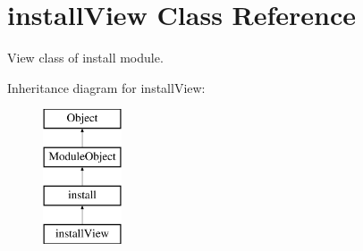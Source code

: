\hypertarget{classinstallView}{\section{install\+View Class Reference}
\label{classinstallView}
}


View class of install module.  


Inheritance diagram for install\+View\+:\begin{figure}[H]
\begin{center}
\leavevmode
\includegraphics[height=4.000000cm]{classinstallView}
\end{center}
\end{figure}
